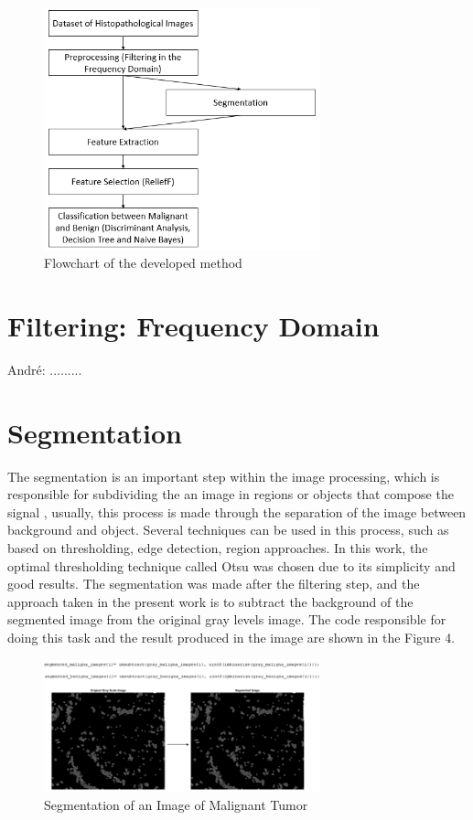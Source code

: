 \documentclass[conference]{IEEEtran}
\begin{document}
\begin{figure}[h]
    \centering
    \includegraphics[width=8cm]{Figuras/imagem3.png}
    \caption{Flowchart of the developed method}
    \label{fig:my_label}
\end{figure}

\section{Filtering: Frequency Domain}
André: .........


\section{Segmentation}
The segmentation is an important step within the image processing, which is responsible for subdividing the an image in regions or objects that compose the signal \cite{Gonzalez:2006:DIP:1076432}, usually, this process is made through the separation of the image between background and object. Several techniques can be used in this process, such as based on thresholding, edge detection, region approaches. In this work, the optimal thresholding technique called Otsu was chosen due to its simplicity and good results. The segmentation was made after the filtering step, and the approach taken in the present work is to subtract the background of the segmented image from the original gray levels image. The code responsible for doing this task and the result produced in the image are shown in the Figure 4.

\begin{figure}[h]
    \centering
    \includegraphics[width=8cm]{Figuras/imagem_segmentacao.png}
    \caption{Segmentation of an Image of Malignant Tumor}
    \label{fig:my_label}
\end{figure}
\end{document}
